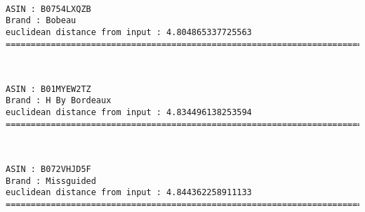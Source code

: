 \documentclass[11pt]{article}
\begin{document}
    
    
    \begin{center}
    \end{center}
    { \hspace*{\fill} \\}
    
    \begin{Verbatim}[commandchars=\\\{\}]
ASIN : B0754LXQZB
Brand : Bobeau
euclidean distance from input : 4.804865337725563
=============================================================================================================================

    \end{Verbatim}

    
    
    \begin{center}
    \end{center}
    { \hspace*{\fill} \\}
    
    \begin{Verbatim}[commandchars=\\\{\}]
ASIN : B01MYEW2TZ
Brand : H By Bordeaux
euclidean distance from input : 4.834496138253594
=============================================================================================================================

    \end{Verbatim}

    
    
    \begin{center}
    \end{center}
    { \hspace*{\fill} \\}
    
    \begin{Verbatim}[commandchars=\\\{\}]
ASIN : B072VHJD5F
Brand : Missguided
euclidean distance from input : 4.844362258911133
=============================================================================================================================

    \end{Verbatim}
\end{document}
